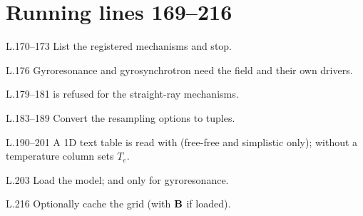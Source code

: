\section*{\normalsize Running \hfill{\small\mdseries\color{gray}lines 169--216}}

\begin{lines}
\item[L.170–173] List the registered mechanisms and stop.
\item[L.176] Gyroresonance and gyrosynchrotron need the field and their own drivers.
\item[L.179–181]  is refused for the straight-ray mechanisms.
\item[L.183–189] Convert the resampling options to tuples.
\item[L.190–201] A 1D text table is read with  (free-free and simplistic only); without a temperature column  sets $T_e$.
\item[L.203] Load the model;  and  only for gyroresonance.
\item[L.216] Optionally cache the grid (with $\mathbf{B}$ if loaded).
\end{lines}
